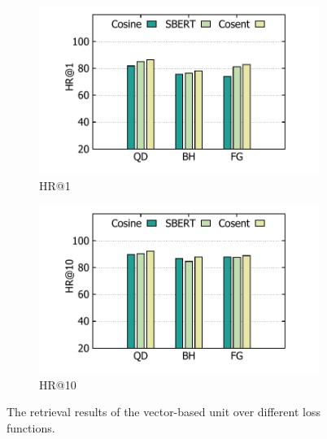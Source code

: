 \begin{figure}
  \begin{subfigure}[b]{0.49\columnwidth}
  \centering
  \includegraphics[width=\columnwidth]{hr_1.pdf}
  \caption{HR@1}
  \end{subfigure}
  \hfill
  \begin{subfigure}[b]{0.49\columnwidth}
  \centering
  \includegraphics[width=\columnwidth]{hr_10.pdf}
  \caption{HR@10}
  \end{subfigure}
  \caption{The retrieval results of the vector-based unit over different loss functions.}
  \label{fig:vector-retri}
\end{figure}

